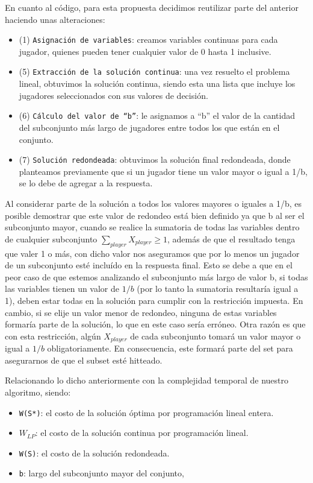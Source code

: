 

En cuanto al código, para esta propuesta decidimos reutilizar parte del anterior haciendo unas alteraciones:
\begin{itemize}
	\item (1) \texttt{Asignación de variables}: creamos variables continuas para cada jugador, quienes pueden tener cualquier valor de 0 hasta 1 inclusive.
	\item (5) \texttt{Extracción de la solución continua}: una vez resuelto el problema lineal, obtuvimos la solución continua, siendo esta una lista que incluye los jugadores seleccionados con sus valores de decisión.
    \item (6) \texttt{Cálculo del valor de “b”}: le asignamos a “b” el valor de la cantidad del subconjunto más largo de jugadores entre todos los que están en el conjunto.
    \item (7) \texttt{Solución redondeada}: obtuvimos la solución final redondeada, donde planteamos previamente que si un jugador tiene un valor mayor o igual a 1/b, se lo debe de agregar a la respuesta.
\end{itemize}

Al considerar parte de la solución a todos los valores mayores o iguales a 1/b, es posible demostrar que este valor de redondeo está bien definido ya que b al ser el subconjunto mayor, cuando se realice la sumatoria de todas las variables dentro de cualquier subconjunto $\sum\limits_{player} X_{player} \geq 1$, además de que el resultado tenga que valer 1 o más, con dicho valor nos aseguramos que por lo menos un jugador de un subconjunto esté incluído en la respuesta final. Esto se debe a que en el peor caso de que estemos analizando el subconjunto más largo de valor b, si todas las variables tienen un valor de $1/b$ (por lo tanto la sumatoria resultaría igual a 1), deben estar todas en la solución para cumplir con la restricción impuesta. En cambio, si se elije un valor menor de redondeo, ninguna de estas variables formaría parte de la solución, lo que en este caso sería erróneo. Otra razón es que con esta restricción, algún $X_{player}$ de cada subconjunto tomará un valor mayor o igual a $1/b$ obligatoriamente. En consecuencia, este formará parte del set para asegurarnos de que el subset esté hitteado.

Relacionando lo dicho anteriormente con la complejidad temporal de nuestro algoritmo,
siendo:
\begin{itemize}
    \item \texttt{W(S*)}: el costo de la solución óptima por programación lineal entera.
    \item \texttt{$W_{LP}$}: el costo de la solución continua por programación lineal.
    \item  \texttt{W(S)}: el costo de la solución redondeada.
    \item \texttt{b}: largo del subconjunto mayor del conjunto,
\end{itemize}

